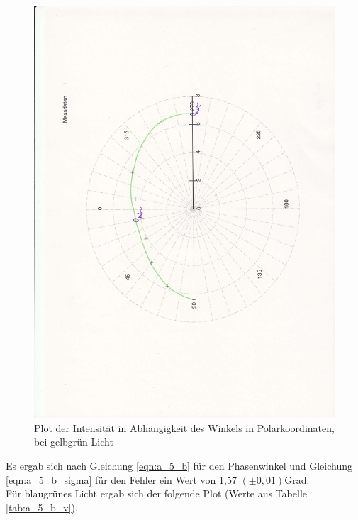 \documentclass[12pt]{scrartcl}
\begin{document}
\begin{enumerate}
\begin{figure}[H]
\centering
    \includegraphics[scale = 0.3, angle = -90]{a_5_gg.pdf}
  	\caption[Plot der Intensität in Abhängigkeit des Winkels in Polarkoordinaten, bei gelbgrün Licht]{Plot der Intensität in Abhängigkeit des Winkels in Polarkoordinaten, bei gelbgrün Licht}
  \label{fig:a_5_gg}
\end{figure}

Es ergab sich nach Gleichung \ref{eqn:a_5_b} für den Phasenwinkel und Gleichung \ref{eqn:a_5_b_sigma} für den Fehler ein Wert von 1,57 $(\pm 0,01)$Grad.\\

Für blaugrünes Licht ergab sich der folgende Plot (Werte aus Tabelle \ref{tab:a_5_b_v}).


\end{enumerate}
\end{document}
